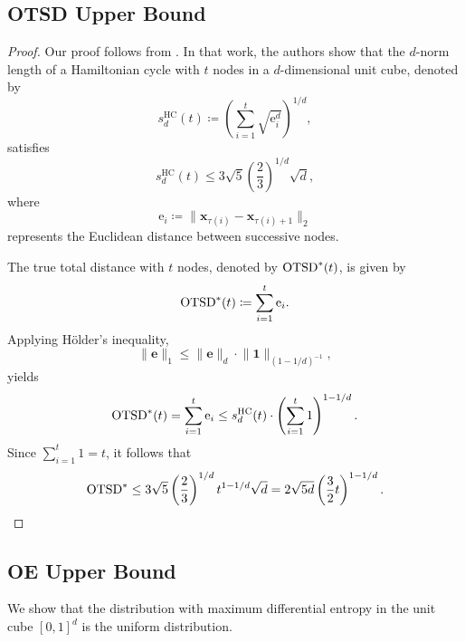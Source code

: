 \documentclass[accepted]{uai2025}
\newcommand{\perm}[1][]{\tau_{#1}}
\begin{document}
\subsection{OTSD Upper Bound}
\label{ssec:proof-otsd}
\begin{proof}
Our proof follows from \citet[Theorem 1.3]{balogh2024traveling}. In that work, the authors show that the $d$-norm length of a Hamiltonian cycle with $t$ nodes in a $d$-dimensional unit cube, denoted by 
\begin{equation}
s^\text{HC}_d(t) \coloneqq \left(\sum_{i=1}^t \sqrt{\mathrm{e}_i^d}\right)^{1/d},
\end{equation}
satisfies
\begin{equation}
s^\text{HC}_d(t) \leq 3\sqrt{5}\left(\frac{2}{3}\right)^{1/d}\sqrt{d},
\end{equation}
where
\begin{equation}
\mathrm{e}_i \coloneqq \lVert \bm{x}_{\perm(i)} - \bm{x}_{\perm(i)+1}\rVert_2
\end{equation}
represents the Euclidean distance between successive nodes.

The true total distance with $t$ nodes, denoted by $\textup{OTSD}^\ast(t)$, is given by
\begin{equation}
\textup{OTSD}^\ast(t) \coloneqq \sum_{i=1}^t \mathrm{e}_i.
\end{equation}
Applying Hölder's inequality,
\begin{equation}
\lVert\bm{e}\rVert_1 \leq \lVert\bm{e}\rVert_d \cdot \lVert\bm{1}\rVert_{(1-1/d)^{-1}},
\end{equation}
yields
\begin{equation}
\textup{OTSD}^\ast(t) = \sum_{i=1}^t \mathrm{e}_i \leq s^\text{HC}_d(t) \cdot \left(\sum_{i=1}^t 1\right)^{1-1/d}.
\end{equation}
Since $\sum_{i=1}^t 1 = t$, it follows that
\begin{equation}
\textup{OTSD}^\ast \leq 3\sqrt{5}\left(\frac{2}{3}\right)^{1/d}t^{1-1/d}\sqrt{d} = 2\sqrt{5d}\left(\frac{3}{2}t\right)^{1 - 1/d}.
\end{equation}
\end{proof}

\subsection{OE Upper Bound}
\label{ssec:proof-oe-bound}
We show that the distribution with maximum differential entropy in the unit cube $[0, 1]^d$ is the uniform distribution.
\end{document}
